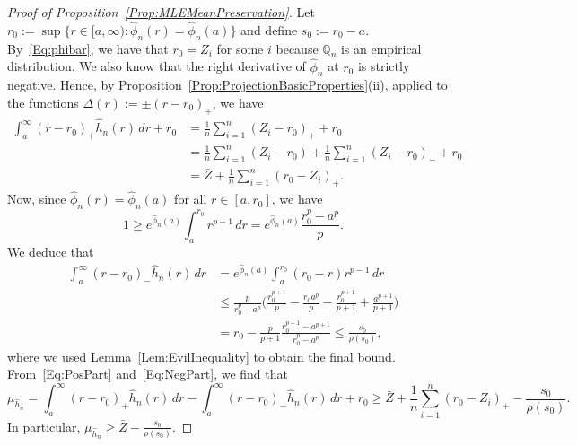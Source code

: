 \documentclass[a4paper,12pt]{article}
\begin{document}
\begin{proof}[Proof of Proposition~\ref{Prop:MLEMeanPreservation}]
Let $r_0 := \sup \{ r \in [a, \infty) : \hat{\phi}_n(r) = \hat{\phi}_n(a) \}$ and define $s_0 := r_0  - a$.  By~\eqref{Eq:phibar}, we have that $r_0 = Z_i$ for some $i$ because $\mathbb{Q}_n$ is an empirical distribution. We also know that the right derivative of $\hat{\phi}_n$ at $r_0$ is strictly negative.  Hence, by Proposition~\ref{Prop:ProjectionBasicProperties}(ii), applied to the functions $\Delta(r) := \pm(r-r_0)_+$, we have
\begin{align}
\label{Eq:PosPart}
\int_{a}^\infty (r-r_0)_+ \hat{h}_n(r) \, dr + r_0 &= \frac{1}{n} \sum_{i=1}^n (Z_i - r_0)_+ + r_0 \nonumber \\
                       &= \frac{1}{n} \sum_{i=1}^n (Z_i - r_0) + \frac{1}{n} \sum_{i=1}^n (Z_i - r_0)_- + r_0 \nonumber \\
                       &= \bar{Z} + \frac{1}{n} \sum_{i=1}^n (r_0 - Z_i)_+.    
\end{align}
Now, since $\hat{\phi}_n(r) = \hat{\phi}_n(a)$ for all $r \in [a,r_0]$, we have 
\[
1 \geq e^{\hat{\phi}_n(a)} \int_{a}^{r_0} r^{p-1} \, dr = e^{\hat{\phi}_n(a)}\frac{r_0^p - a^p}{p}.
\]
We deduce that
\begin{align}
\label{Eq:NegPart}
\int_{a}^\infty (r-r_0)_- \hat{h}_n(r) \, dr &= e^{\hat{\phi}_n(a)} \int_{a}^{r_0} (r_0 - r) r^{p-1} \, dr \nonumber \\
  &\leq \frac{p}{r_0^p - a^p}\biggl( \frac{r_0^{p+1}}{p} - \frac{r_0 a^p}{p} - \frac{r_0^{p+1}}{p+1} + \frac{a^{p+1}}{p+1} \biggr) \nonumber \\
  &=  r_0 - \frac{p}{p+1} \frac{r_0^{p+1} - a^{p+1}}{r_0^p - a^p} \leq \frac{s_0}{\rho(s_0)},
\end{align}
where we used Lemma~\ref{Lem:EvilInequality} to obtain the final bound.  From~\eqref{Eq:PosPart} and~\eqref{Eq:NegPart}, we find that 
\begin{equation}
\label{Eq:muhatlower}
\mu_{\hat{h}_n} = \int_{a}^\infty (r-r_0)_+ \hat{h}_n(r) \, dr - \int_{a}^\infty (r-r_0)_- \hat{h}_n(r) \, dr + r_0 \geq \bar{Z} + \frac{1}{n} \sum_{i=1}^n (r_0 - Z_i)_+ - \frac{s_0}{\rho(s_0)}.
\end{equation}
In particular, $\mu_{\hat{h}_n} \geq \bar{Z} - \frac{s_0}{\rho(s_0)}$. 


\end{proof}
\end{document}

